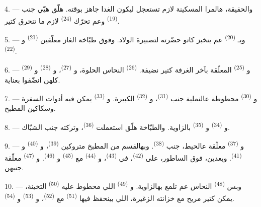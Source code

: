 4. --- والحقيقة، هالمرا المسكينة لازم تستعجل ليكون الغدا جاهز بوقته.
هلّق هيّي جنب  \textsuperscript{(19)} وعم تحرّك
 \textsuperscript{(24)} لازم ما تنحرق كتير.

5. --- وبـ \textsuperscript{(20)} عم ينخبز كاتو حضّرته
لتصبيرة الولاد. وفوق طبّاخة الغاز معلّقين 
\textsuperscript{(21)} و \textsuperscript{(22)}.

\VUsaut{4.0mm}
\VUsaut{3.0mm}

6. --- و \textsuperscript{(25)} المعلّقة بآخر الغرفة
كتير نضيفة.  \textsuperscript{(26)} النحاس الحلوة،
و \textsuperscript{(27)}، و
\textsuperscript{(28)} و \textsuperscript{(29)} كلهن
انضّفوا بعناية.

7. --- و \textsuperscript{(30)} محطوطة عالنملية جنب
 \textsuperscript{(31)}، و
\textsuperscript{(32)} الكبيرة. و \textsuperscript{(33)}
يمكن فيه أدوات السفرة وسكاكين المطبخ.

8. --- و \textsuperscript{(34)} و
\textsuperscript{(35)} بالزاوية. والطبّاخة هلّق استعملت  \textsuperscript{(36)}، وتركته جنب الشبّاك.

9. --- و \textsuperscript{(37)} معلّقة عالحيط، جنب
 \textsuperscript{(38)}. وبهالقسم من المطبخ متروكين
 \textsuperscript{(39)}، و
\textsuperscript{(40)} و \textsuperscript{(41)}. وبعدين،
فوق الساطور، على  \textsuperscript{(42)}، في 
\textsuperscript{(43)}، و \textsuperscript{(44)} مع
 \textsuperscript{(45)} و
\textsuperscript{(46)}. و \textsuperscript{(47)} معلّقة
جنبهن.

10. --- وبس  \textsuperscript{(48)} النحاس عم تلمع
بهالزاوية. و \textsuperscript{(49)} اللي محطوط عليه
 \textsuperscript{(50)} التخينة، يمكن كتير مريح مع خزانته
الزغيرة، اللي بينحفظ فيها  \textsuperscript{(51)} مع
 \textsuperscript{(52)}، و
\textsuperscript{(53)} و \textsuperscript{(54)}.

